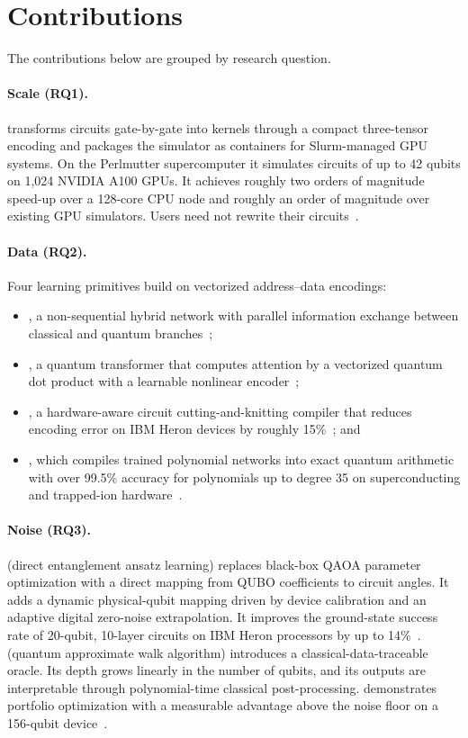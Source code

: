 \section{Contributions}\label{sec:intro:contributions}

The contributions below are grouped by research question.

\paragraph{Scale (RQ1).}
\qgear{} transforms \qiskit{} circuits gate-by-gate into \cudaq{} kernels through a compact three-tensor encoding and packages the simulator as containers for Slurm-managed GPU systems. On the Perlmutter supercomputer it simulates circuits of up to 42 qubits on 1,024 NVIDIA A100 GPUs. It achieves roughly two orders of magnitude speed-up over a 128-core CPU node and roughly an order of magnitude over existing GPU simulators. Users need not rewrite their circuits~\cite{guo2025qgear}.

\paragraph{Data (RQ2).}
Four learning primitives build on vectorized address--data encodings:
\begin{itemize}[nosep,leftmargin=1.5em]
\item \qpie{}, a non-sequential hybrid network with parallel information exchange between classical and quantum branches~\cite{guo2025qpie};
\item \vqt{}, a quantum transformer that computes attention by a vectorized quantum dot product with a learnable nonlinear encoder~\cite{guo2025vqt};
\item \shardq{}, a hardware-aware circuit cutting-and-knitting compiler that reduces encoding error on IBM Heron devices by roughly 15\%~\cite{guo2025shardq}; and
\item \nnqa{}, which compiles trained polynomial networks into exact quantum arithmetic with over 99.5\% accuracy for polynomials up to degree 35 on superconducting and trapped-ion hardware~\cite{guo2026nnqa}.
\end{itemize}

\paragraph{Noise (RQ3).}
\deal{} (direct entanglement ansatz learning) replaces black-box QAOA parameter optimization with a direct mapping from QUBO coefficients to circuit angles. It adds a dynamic physical-qubit mapping driven by device calibration and an adaptive digital zero-noise extrapolation. It improves the ground-state success rate of 20-qubit, 10-layer circuits on IBM Heron processors by up to 14\%~\cite{guo2025deal}. \qawa{} (quantum approximate walk algorithm) introduces a classical-data-traceable oracle. Its depth grows linearly in the number of qubits, and its outputs are interpretable through polynomial-time classical post-processing. \qawa{} demonstrates portfolio optimization with a measurable advantage above the noise floor on a 156-qubit device~\cite{guo2025qawa}.

